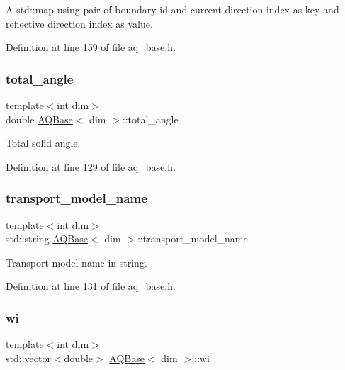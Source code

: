 A std\+::map using pair of boundary id and current direction index as key and reflective direction index as value. 

Definition at line 159 of file aq\+\_\+base.\+h.

\mbox{\label{class_a_q_base_a930e1dbffe2c99f42b76ea3164905ac1}} 
\subsubsection{\texorpdfstring{total\+\_\+angle}{total\_angle}}
{\footnotesize\ttfamily template$<$int dim$>$ \\
double \hyperlink{class_a_q_base}{A\+Q\+Base}$<$ dim $>$\+::total\+\_\+angle\hspace{0.3cm}{\ttfamily [protected]}}



Total solid angle. 



Definition at line 129 of file aq\+\_\+base.\+h.

\mbox{\label{class_a_q_base_a14d94b7179306f35228b90fd5f42c65a}} 
\subsubsection{\texorpdfstring{transport\+\_\+model\+\_\+name}{transport\_model\_name}}
{\footnotesize\ttfamily template$<$int dim$>$ \\
std\+::string \hyperlink{class_a_q_base}{A\+Q\+Base}$<$ dim $>$\+::transport\+\_\+model\+\_\+name\hspace{0.3cm}{\ttfamily [protected]}}



Transport model name in string. 



Definition at line 131 of file aq\+\_\+base.\+h.

\mbox{\label{class_a_q_base_aa43b0232837b86e608da7507bd9a14b5}} 
\subsubsection{\texorpdfstring{wi}{wi}}
{\footnotesize\ttfamily template$<$int dim$>$ \\
std\+::vector$<$double$>$ \hyperlink{class_a_q_base}{A\+Q\+Base}$<$ dim $>$\+::wi\hspace{0.3cm}{\ttfamily [protected]}}



